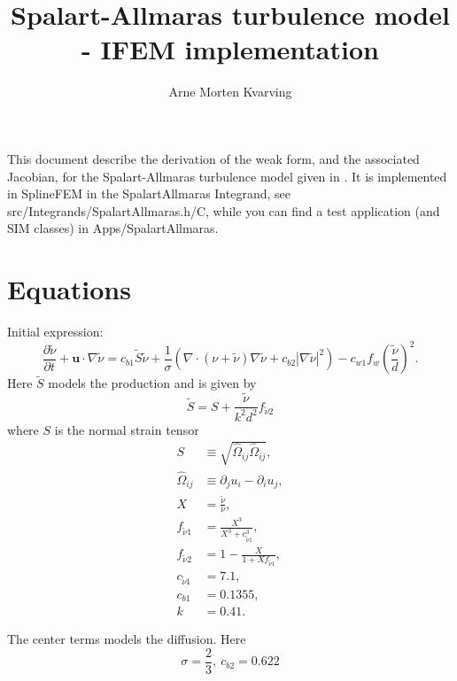\documentclass[twoside, 11pt, a4paper]{article}
\title{Spalart-Allmaras turbulence model - IFEM implementation}
\author{Arne Morten Kvarving}
\begin{document}
\maketitle

This document describe the derivation of the weak form, and the associated
Jacobian, for the Spalart-Allmaras turbulence model given in \cite{sa}.
It is implemented in SplineFEM in the SpalartAllmaras
Integrand, see src/Integrands/SpalartAllmaras.h/C, while
you can find a test application (and SIM classes) in Apps/SpalartAllmaras.

\section{Equations}

Initial expression:
\begin{equation}
	\frac{\partial\tilde{\nu}}{\partial t} + \mathbf{u}\cdot\nabla\tilde{\nu} = c_{b1}\tilde{S}\tilde{\nu}+\frac{1}{\sigma}\left(\nabla\cdot\left(\nu + \tilde{\nu}\right)\nabla\tilde{\nu} + c_{b2}\left|\nabla\tilde{\nu}\right|^2\right) - c_{w1}f_w\left(\frac{\tilde{\nu}}{d}\right)^2.
\end{equation}
Here $\tilde{S}$ models the production and is given by
\begin{equation}
	\tilde{S} = S + \frac{\tilde{\nu}}{k^2d^2}f_{\tilde{\nu}2}
\end{equation}
where $S$ is the normal strain tensor
\begin{equation}
	\begin{split}
		S &\equiv \sqrt{\hat{\Omega}_{ij}\hat{\Omega}_{ij}}, \\
		\hat{\Omega}_{ij} &\equiv \partial_j u_i - \partial_i u_j, \\
		X &= \frac{\tilde{\nu}}{\nu}, \\
		f_{\tilde{\nu}1} &= \frac{X^3}{X^3+c_{\tilde{\nu}1}^3}, \\
		f_{\tilde{\nu}2} &= 1-\frac{X}{1+Xf_{\tilde{\nu}1}}, \\
		c_{\tilde{\nu}1} &= 7.1, \\
		c_{b1} &= 0.1355, \\
		k &= 0.41.
	\end{split}
\end{equation}

The center terms models the diffusion. Here
\begin{equation}
	\sigma = \frac{2}{3},\ c_{b2} = 0.622
\end{equation}
\end{document}
